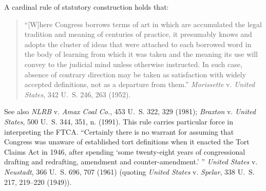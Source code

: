 {A cardinal rule of statutory construction holds that:
\begin{quotation}
“[W]here Congress borrows terms of art in which are
accumulated the legal tradition and meaning of centuries
of practice, it presumably knows and adopts the cluster
of ideas that were attached to each borrowed word in
the body of learning from which it was taken and the
meaning its use will convey to the judicial mind unless
otherwise instructed. In such case, absence of contrary
direction may be taken as satisfaction with widely accepted
definitions, not as a departure from them.”
\textit{Morissette} v. \textit{United States}, 342 U.~S. 246, 263 (1952).
\end{quotation}
See also \textit{NLRB} v. \textit{Amax Coal Co.}, 453 U.~S. 322, 329 (1981);
\textit{Braxton} v. \textit{United States}, 500 U.~S. 344, 351, n. (1991). This
rule carries particular force in interpreting the FTCA. 
“Certainly there is no warrant for assuming that Congress was
unaware of established tort definitions when it enacted the
Tort Claims Act in 1946, after spending ‘some twenty-eight
years of congressional drafting and redrafting, amendment
and counter-amendment.’ ” \textit{United States} v. \textit{Neustadt}, 366
U.~S. 696, 707 (1961) (quoting \textit{United States} v. \textit{Spelar}, 338
U.~S. 217, 219–220 (1949)).\par
}

